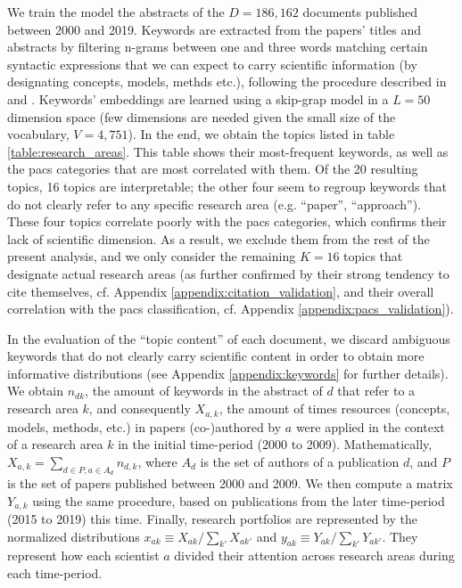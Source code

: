 \documentclass{article}
\begin{document}
We train the model the abstracts of the $D=186,162$ documents published between 2000 and 2019. Keywords are extracted from the papers' titles and abstracts by filtering n-grams between one and three words matching certain syntactic expressions that we can expect to carry scientific information (by designating concepts, models, methds etc.), following the procedure described in \citealt{Gautheron2023} and \citealt{omodei_tel-01097702}. Keywords' embeddings are learned using a skip-grap model in a $L=50$ dimension space (few dimensions are needed given the small size of the vocabulary, $V=4,751$). In the end, we obtain the topics listed in table \ref{table:research_areas}. This table shows their most-frequent keywords, as well as the \gls{pacs} categories that are most correlated with them. Of the 20 resulting topics, 16 topics are interpretable; the other four seem to regroup keywords that do not clearly refer to any specific research area (e.g. ``paper'', ``approach''). These four topics correlate poorly with the \gls{pacs} categories, which confirms their lack of scientific dimension. As a result, we exclude them from the rest of the present analysis, and we only consider the remaining $K=16$ topics that designate actual research areas (as further confirmed by their strong tendency to cite themselves, cf. Appendix \ref{appendix:citation_validation}, and their overall correlation with the \gls{pacs} classification, cf. Appendix \ref{appendix:pacs_validation}).

In the evaluation of the ``topic content'' of each document, we discard ambiguous keywords that do not clearly carry scientific content in order to obtain more informative distributions (see Appendix \ref{appendix:keywords} for further details). We obtain $n_{dk}$, the amount of keywords in the abstract of $d$ that refer to a research area $k$, and consequently $X_{a,k}$, the amount of times resources (concepts, models, methods, etc.) in papers (co-)authored by $a$ were applied in the context of a research area $k$ in the initial time-period (2000 to 2009). Mathematically, $X_{a,k}=\sum_{d\in P,a\in A_d} n_{d,k}$, where $A_d$ is the set of authors of a publication $d$, and $P$ is the set of papers published between 2000 and 2009. We then compute a matrix $Y_{a,k}$ using the same procedure, based on publications from the later time-period (2015 to 2019) this time. Finally, research portfolios are represented by the normalized distributions $x_{ak} \equiv X_{ak}/\sum_{k'} X_{ak'}$ and $y_{ak} \equiv Y_{ak}/\sum_{k'} Y_{ak'}$. They represent how each scientist $a$ divided their attention across research areas during each time-period.
\end{document}
